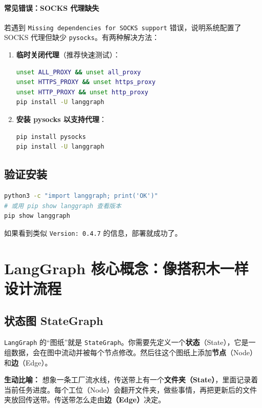 \documentclass[12pt,a4paper]{ctexart}
\newcommand{\langgraph}{\texttt{LangGraph}}
\newcommand{\pysocks}{\texttt{pysocks}}
\begin{document}
\paragraph{常见错误：SOCKS 代理缺失}
若遇到 \texttt{Missing dependencies for SOCKS support} 错误，说明系统配置了 SOCKS 代理但缺少 \pysocks。有两种解决方法：
\begin{enumerate}
    \item \textbf{临时关闭代理}（推荐快速测试）：
\begin{lstlisting}[language=bash]
unset ALL_PROXY && unset all_proxy
unset HTTPS_PROXY && unset https_proxy
unset HTTP_PROXY && unset http_proxy
pip install -U langgraph
\end{lstlisting}
    \item \textbf{安装 pysocks 以支持代理}：
\begin{lstlisting}[language=bash]
pip install pysocks
pip install -U langgraph
\end{lstlisting}
\end{enumerate}

\subsection{验证安装}
\begin{lstlisting}[language=bash]
python3 -c "import langgraph; print('OK')"
# 或用 pip show langgraph 查看版本
pip show langgraph
\end{lstlisting}
如果看到类似 \texttt{Version: 0.4.7} 的信息，部署就成功了。

\section{LangGraph 核心概念：像搭积木一样设计流程}
\label{sec:concept}

\subsection{状态图 StateGraph}
\langgraph{} 的“图纸”就是 \texttt{StateGraph}。你需要先定义一个\textbf{状态}（State），它是一组数据，会在图中流动并被每个节点修改。然后往这个图纸上添加\textbf{节点}（Node）和\textbf{边}（Edge）。

\textbf{生动比喻：}  
想象一条工厂流水线，传送带上有一个\textbf{文件夹（State）}，里面记录着当前任务进度。每个工位（Node）会翻开文件夹，做些事情，再把更新后的文件夹放回传送带。传送带怎么走由\textbf{边（Edge）}决定。
\end{document}
